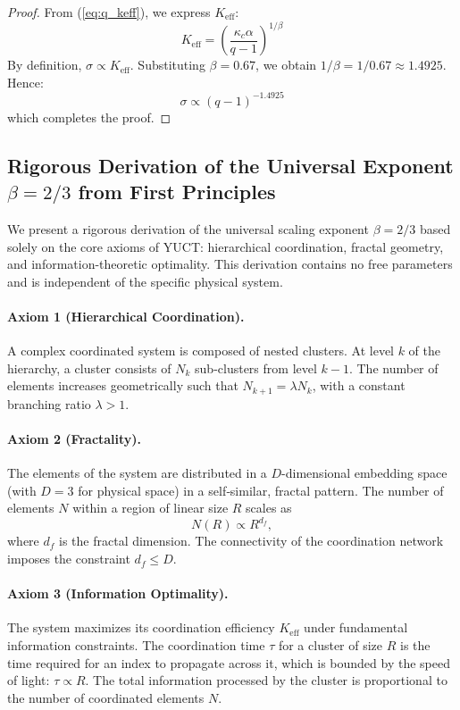 \documentclass[12pt,a4paper]{article}
\theoremstyle{remark}
\newcommand{\Ke}{K_{\mathrm{eff}}}
\newcommand{\kappac}{\kappa_c}
\newcommand{\alp}{\alpha}
\begin{document}
	\begin{proof}
		From (\ref{eq:q_keff}), we express \(\Ke\):
		\[
		\Ke = \left( \frac{\kappac \alp}{q-1} \right)^{1/\beta}
		\]
		By definition, \(\sigma \propto \Ke\). Substituting \(\beta = 0.67\), we obtain \(1/\beta = 1/0.67 \approx 1.4925\). Hence:
		\[
		\sigma \propto (q-1)^{-1.4925}
		\]
		which completes the proof.
	\end{proof}
	
\subsection{Rigorous Derivation of the Universal Exponent \(\beta = 2/3\) from First Principles}
\label{subsec:beta_derivation}

We present a rigorous derivation of the universal scaling exponent \(\beta = 2/3\) based solely on the core axioms of YUCT: hierarchical coordination, fractal geometry, and information-theoretic optimality. This derivation contains no free parameters and is independent of the specific physical system.

\paragraph{Axiom 1 (Hierarchical Coordination).}
A complex coordinated system is composed of nested clusters. At level \(k\) of the hierarchy, a cluster consists of \(N_k\) sub-clusters from level \(k-1\). The number of elements increases geometrically such that \(N_{k+1} = \lambda N_k\), with a constant branching ratio \(\lambda > 1\).

\paragraph{Axiom 2 (Fractality).}
The elements of the system are distributed in a \(D\)-dimensional embedding space (with \(D = 3\) for physical space) in a self‑similar, fractal pattern. The number of elements \(N\) within a region of linear size \(R\) scales as
\begin{equation}
	N(R) \propto R^{d_f},
	\label{eq:fractal_dim}
\end{equation}
where \(d_f\) is the fractal dimension. The connectivity of the coordination network imposes the constraint \(d_f \le D\).

\paragraph{Axiom 3 (Information Optimality).}
The system maximizes its coordination efficiency \(\Ke\) under fundamental information constraints. The coordination time \(\tau\) for a cluster of size \(R\) is the time required for an index to propagate across it, which is bounded by the speed of light: \(\tau \propto R\). The total information processed by the cluster is proportional to the number of coordinated elements \(N\).
\end{document}
